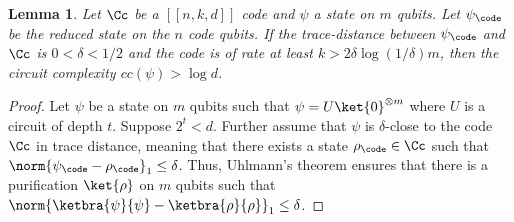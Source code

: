 \documentclass[11pt]{article}
\newtheorem{lemma}[theorem]{Lemma}
\begin{document}
%


\begin{lemma}
\label{lem:warmup-lemma}
Let $\Cc$ be a $[[n,k,d]]$ code and $\psi$ a state on $m$ qubits. Let $\psi_\code$ be the reduced state on the $n$ code qubits. If the trace-distance between $\psi_\code$ and $\Cc$ is $0 < \delta < 1/2$ and the code is of rate at least $k > 2 \delta \log(1/\delta) m$,
then the circuit complexity $cc(\psi) > \log d$.
\end{lemma}



\begin{proof}
Let $\psi$ be a state on $m$ qubits such that $\psi = U \ket{0}^{\otimes m}$ where $U$ is a circuit of depth $t$. Suppose $2^t<d$. Further assume that $\psi$ is $\delta$-close to the code $\Cc$ in trace distance, meaning that there exists a state $\rho_\code \in \Cc$ such that $\norm{\psi_{\code} - \rho_\code}_1 \leq \delta$. Thus, Uhlmann's theorem \cite{uhlmann76} ensures that there is a purification $\ket{\rho}$ on $m$ qubits such that $\norm{\ketbra{\psi}{\psi} - \ketbra{\rho}{\rho}}_1 \leq \delta$.



\end{proof}
\end{document}
